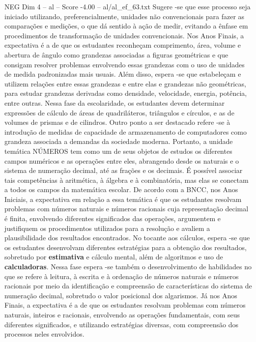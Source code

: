 \begin{textsample}{NEG Dim 4 – al – Score -4.00 – al/al\_ef\_63.txt}
Sugere -se que esse processo seja iniciado utilizando, preferencialmente, unidades não convencionais para fazer as comparações e medições, o que dá sentido à ação de medir, evitando a ênfase em procedimentos de transformação de unidades convencionais.
Nos Anos Finais, a expectativa é a de que os estudantes reconheçam comprimento, área, volume e abertura de ângulo como grandezas associadas a figuras geométricas e que consigam resolver problemas envolvendo essas grandezas com o uso de unidades de medida padronizadas mais usuais.
Além disso, espera -se que estabeleçam e utilizem relações entre essas grandezas e entre elas e grandezas não geométricas, para estudar grandezas derivadas como densidade, velocidade, energia, potência, entre outras.
Nessa fase da escolaridade, os estudantes devem determinar expressões de cálculo de áreas de quadriláteros, triângulos e círculos, e as de volumes de prismas e de cilindros.
Outro ponto a ser destacado refere -se à introdução de medidas de capacidade de armazenamento de computadores como grandeza associada a demandas da sociedade moderna.
Portanto, a unidade temática NÚMEROS tem como um de seus objetos de estudos os diferentes campos numéricos e as operações entre eles, abrangendo desde os naturais e o sistema de numeração decimal, até as frações e os decimais.
É possível associar tais competências à aritmética, à álgebra e à combinatória, mas elas se conectam a todos os campos da matemática escolar.
De acordo com a BNCC, nos Anos Iniciais, a expectativa em relação a essa temática é que os estudantes resolvam problemas com números naturais e números racionais cuja representação decimal é finita, envolvendo diferentes significados das operações, argumentem e justifiquem os procedimentos utilizados para a resolução e avaliem a plausibilidade dos resultados encontrados.
No tocante aos cálculos, espera -se que os estudantes desenvolvam diferentes estratégias para a obtenção dos resultados, sobretudo por \textbf{estimativa} e cálculo mental, além de algoritmos e uso de \textbf{calculadoras}.
Nessa fase espera -se também o desenvolvimento de habilidades no que se refere à leitura, à escrita e à ordenação de números naturais e números racionais por meio da identificação e compreensão de características do sistema de numeração decimal, sobretudo o valor posicional dos algarismos.
Já nos Anos Finais, a expectativa é a de que os estudantes resolvam problemas com números naturais, inteiros e racionais, envolvendo as operações fundamentais, com seus diferentes significados, e utilizando estratégias diversas, com compreensão dos processos neles envolvidos.

\end{textsample}
